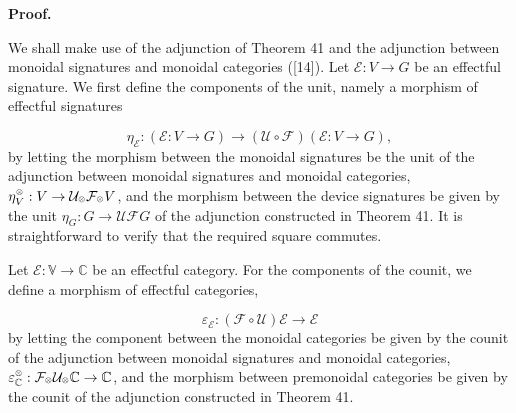  
 
 
 
 
\par\medskip\noindent\textbf{Proof.}\par
 
 
We shall make use of the adjunction of Theorem 41 and the adjunction between monoidal signatures and monoidal categories ([14]). Let $\mathcal{E}:V\to G$ be an effectful signature. We first define the components of the unit, namely a morphism of effectful signatures\par
    \[\eta_{\mathcal{E}}:(\mathcal{E}:V\to G)\to(\mathscr{U}\circ\mathscr{F})(\mathcal{E}:V\to G),\]    
by letting the morphism between the monoidal signatures be the unit of the adjunction between monoidal signatures and monoidal categories, $\eta^{\mathbin{\raisebox{1.25pt}{$\scriptscriptstyle\otimes$}}}_{V}:V\to\mathcal{U}_{\mathbin{\raisebox{1.25pt}{$\scriptscriptstyle\otimes$}}}\mathcal{F}_{\mathbin{\raisebox{1.25pt}{$\scriptscriptstyle\otimes$}}}V$, and the morphism between the device signatures be given by the unit $\eta_{G}:G\to\mathcal{U}\mathcal{F}G$ of the adjunction constructed in Theorem 41. It is straightforward to verify that the required square commutes.\par
 
 
 
Let $\mathscr{E}:\mathbb{V}\to\mathbb{C}$ be an effectful category. For the components of the counit, we define a morphism of effectful categories,\par
    \[\varepsilon_{\mathscr{E}}:(\mathscr{F}\circ\mathscr{U})\mathscr{E}\to\mathscr{E}\]    
by letting the component between the monoidal categories be given by the counit of the adjunction between monoidal signatures and monoidal categories, $\varepsilon^{\mathbin{\raisebox{1.25pt}{$\scriptscriptstyle\otimes$}}}_{\mathbb{C}}:\mathcal{F}_{\mathbin{\raisebox{1.25pt}{$\scriptscriptstyle\otimes$}}}\mathcal{U}_{\mathbin{\raisebox{1.25pt}{$\scriptscriptstyle\otimes$}}}\mathbb{C}\to\mathbb{C}$, and the morphism between premonoidal categories be given by the counit of the adjunction constructed in Theorem 41.\par
 
